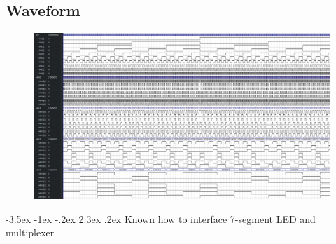 \documentclass[13pt,a4paper]{report}
\makeatletter
\renewcommand\section{\@startsection {section}{1}{-1em}%
  {-3.5ex \@plus -1ex \@minus -.2ex}%
  {2.3ex \@plus.2ex}%
  {\normalfont\Large\bfseries}}
\makeatother
\begin{document}
\subsection{Waveform}
\begin{figure}[H]
\centering
\includegraphics[]{images/Exc3_waveform.png}
\end{figure}

\section{Known how to interface 7-segment LED and multiplexer}

\newcommand{\HELLO}[6]{
\begin{circuitikz}\ctikzset{seven seg/width=0.25, seven seg/thickness=3pt}\draw (#1,0) node[seven segment bits=0110111 dot none box off]{}; \draw (#2,0) node[seven segment val=E dot none box off]{}; \draw (#3,0) node[seven segment bits=0001110 dot none box off]{}; \draw (#4,0) node[seven segment bits=0001110 dot none box off]{}; \draw (#5,0) node[seven segment val=0 dot none box off]{}; \draw (#6,0) node[seven segment val= dot none box off]{};\end{circuitikz}
}

\newcommand{\HELLOb}[6]{
\begin{circuitikz}\ctikzset{seven seg/width=0.25, seven seg/thickness=3pt}\draw (#1,0) node[seven segment val= dot none box off]{}; \draw (#2,0) node[seven segment val= dot none box off]{}; \draw (#3,0) node[seven segment val= dot none box off]{}; \draw (#4,0) node[seven segment val= dot none box off]{}; \draw (#5,0) node[seven segment val= dot none box off]{}; \draw (#6,0) node[seven segment val= dot none box off]{};\end{circuitikz}
}
\end{document}
